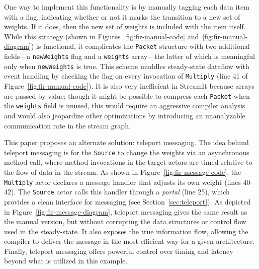 One way to implement this functionality is by manually tagging each
data item with a flag, indicating whether or not it marks the
transition to a new set of weights.  If it does, then the new set of
weights is included with the item itself.  While this strategy (shown
in Figures~\ref{fig:fir-manual-code} and~\ref{fig:fir-manual-diagram})
is functional, it complicates the {\tt Packet} structure with two
additional fields---a {\tt newWeights} flag and a {\tt weights}
array---the latter of which is meaningful only when {\tt newWeights}
is true.  This scheme muddles steady-state dataflow with event
handling by checking the flag on every invocation of {\tt Multiply}
(line 41 of Figure~\ref{fig:fir-manual-code}).  It is also very
inefficient in StreamIt because arrays are passed by value; though it
might be possible to compress each {\tt Packet} when the {\tt weights}
field is unused, this would require an aggressive compiler analysis
and would also jeopardize other optimizations by introducing an
unanalyzable communication rate in the stream graph.

This paper proposes an alternate solution: teleport messaging.  The
idea behind teleport messaging is for the {\tt Source} to change the
weights via an asynchronous method call, where method invocations in
the target actors are timed relative to the flow of data in the
stream.  As shown in Figure~\ref{fig:fir-message-code}, the {\tt
Multiply} actor declares a message handler that adjusts its own weight
(lines 40-42).  The {\tt Source} actor calls this handler through a
{\it portal} (line 25), which provides a clean interface for messaging
(see Section~\ref{sec:teleport}).  As depicted in
Figure~\ref{fig:fir-message-diagram}, teleport messaging gives the
same result as the manual version, but without corrupting the data
structures or control flow used in the steady-state.  It also exposes
the true information flow, allowing the compiler to deliver the
message in the most efficient way for a given architecture.  Finally,
teleport messaging offers powerful control over timing and latency
beyond what is utilized in this example.

